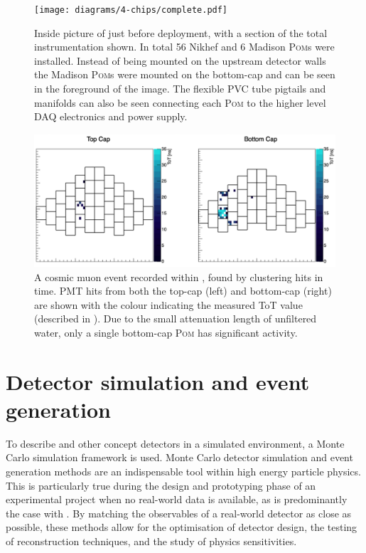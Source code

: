 \begin{figure} %
    \texttt{[image: diagrams/4-chips/complete.pdf]}
    \caption[Inside picture of \chipsfive just before deployment]
    {Inside picture of \chipsfive just before deployment, with a section of the total
        instrumentation shown. In total 56 Nikhef and 6 Madison \textsc{Pom}s were installed.
        Instead of being mounted on the upstream detector walls the Madison \textsc{Pom}s were
        mounted on the bottom-cap and can be seen in the foreground of the image. The flexible PVC
        tube pigtails and manifolds can also be seen connecting each \textsc{Pom} to the higher
        level DAQ electronics and power supply.}
    \label{fig:complete}
\end{figure}

\begin{figure} %
    \includegraphics[width=\textwidth]{diagrams/4-chips/cosmic_event.pdf}
    \caption[A cosmic muon event recorded within \chipsfive]
    {A cosmic muon event recorded within \chipsfive, found by clustering hits in time. PMT hits
    from both the top-cap (left) and bottom-cap (right) are shown with the colour indicating the
    measured ToT value (described in ). Due to the small attenuation
    length of unfiltered water, only a single bottom-cap \textsc{Pom} has significant activity.}
    \label{fig:cosmic_event}
\end{figure}

\section{Detector simulation and event generation} %
\label{sec:chips_monte_carlo} %


To describe \chipsfive and other \chips concept detectors in a simulated environment, a Monte
Carlo simulation framework is used. Monte Carlo detector simulation and event generation methods
are an indispensable tool within high energy particle physics. This is particularly true during
the design and prototyping phase of an experimental project when no real-world data is available,
as is predominantly the case with \chips. By matching the observables of a real-world detector as
close as possible, these methods allow for the optimisation of detector design, the testing of
reconstruction techniques, and the study of physics sensitivities.

